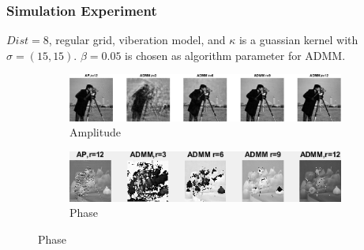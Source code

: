 \documentclass[UTF8]{beamer}
\begin{document}
\begin{frame} \frametitle{Simulation Experiment}

$Dist=8$, regular grid, viberation model, and $\kappa$ is a guassian kernel with $\sigma = (15,15)$. $\beta=0.05$ is chosen as algorithm parameter for ADMM.

\begin{figure}[H]
\centering
\begin{subfigure}{1\textwidth}
    \centering
    \includegraphics[width=0.9\linewidth]{../figures/modes_u.eps}  
   \caption{Amplitude}
    \label{fig:modes_u}
 \end{subfigure}
 \begin{subfigure}{1\textwidth}
    \centering
    \includegraphics[width=.9\linewidth]{../figures/modes_u_phaze.png}  
    \caption{Phase}
    \label{fig:modes_u_phaze}
 \end{subfigure}
 
    \label{fig:modes_images}

 \end{figure}


\end{frame}
\end{document}
